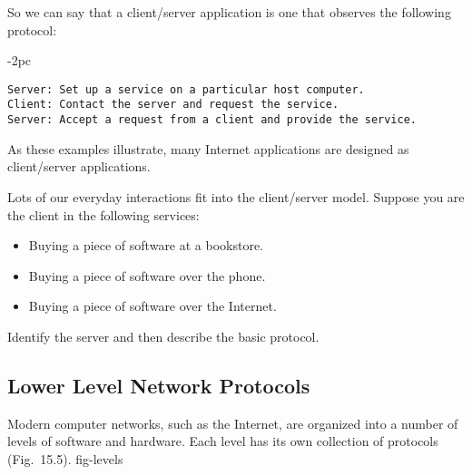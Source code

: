 So we can say that a client/server application is one that observes
the following protocol:

\begin{jjjlistingleft}[28pc]{-2pc}
\begin{lstlisting}
Server: Set up a service on a particular host computer.
Client: Contact the server and request the service.
Server: Accept a request from a client and provide the service.
\end{lstlisting}
\end{jjjlistingleft}


\noindent As these examples illustrate, many Internet applications are 
designed as client/server applications.



\begin{SSTUDY}

\item  Lots of our everyday interactions fit into the cli\-ent/ser\-ver
model.  Suppose you are the client in the following services:

\begin{itemize}
\item  Buying a piece of software at a bookstore.
\item  Buying a piece of software over the phone.
\item  Buying a piece of software over the Internet.
\end{itemize}

\noindent Identify the server and then describe the basic protocol.
\end{SSTUDY}

\subsection{Lower Level Network Protocols}
\noindent Modern computer networks, such as the Internet, are organized into a
number of levels of software and hardware.  Each level has its own
collection of protocols (Fig.~15.5).
{fig-levels}


